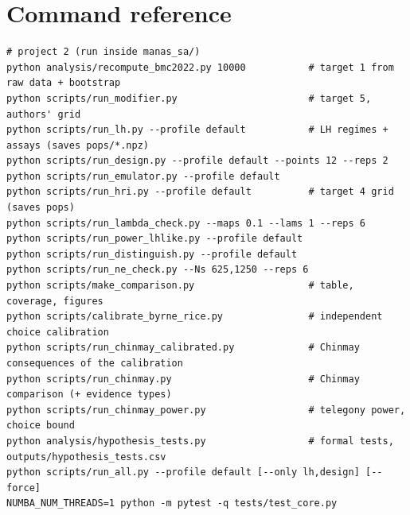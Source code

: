\chapter{Command reference}
\begin{lstlisting}[style=sh]
# project 2 (run inside manas_sa/)
python analysis/recompute_bmc2022.py 10000           # target 1 from raw data + bootstrap
python scripts/run_modifier.py                       # target 5, authors' grid
python scripts/run_lh.py --profile default           # LH regimes + assays (saves pops/*.npz)
python scripts/run_design.py --profile default --points 12 --reps 2
python scripts/run_emulator.py --profile default
python scripts/run_hri.py --profile default          # target 4 grid (saves pops)
python scripts/run_lambda_check.py --maps 0.1 --lams 1 --reps 6
python scripts/run_power_lhlike.py --profile default
python scripts/run_distinguish.py --profile default
python scripts/run_ne_check.py --Ns 625,1250 --reps 6
python scripts/make_comparison.py                    # table, coverage, figures
python scripts/calibrate_byrne_rice.py               # independent choice calibration
python scripts/run_chinmay_calibrated.py             # Chinmay consequences of the calibration
python scripts/run_chinmay.py                        # Chinmay comparison (+ evidence types)
python scripts/run_chinmay_power.py                  # telegony power, choice bound
python analysis/hypothesis_tests.py                  # formal tests, outputs/hypothesis_tests.csv
python scripts/run_all.py --profile default [--only lh,design] [--force]
NUMBA_NUM_THREADS=1 python -m pytest -q tests/test_core.py
\end{lstlisting}

